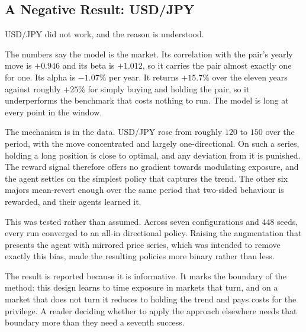 \subsection{A Negative Result: USD/JPY}
\label{Subsection:NegativeResult}

USD/JPY did not work, and the reason is understood.

The numbers say the model is the market. Its correlation with the pair's yearly move is $+0.946$ and its beta is $+1.012$, so it carries the pair almost exactly one for one. Its alpha is $-1.07\%$ per year. It returns $+15.7\%$ over the eleven years against roughly $+25\%$ for simply buying and holding the pair, so it underperforms the benchmark that costs nothing to run. The model is long at every point in the window.

The mechanism is in the data. USD/JPY rose from roughly $120$ to $150$ over the period, with the move concentrated and largely one-directional. On such a series, holding a long position is close to optimal, and any deviation from it is punished. The reward signal therefore offers no gradient towards modulating exposure, and the agent settles on the simplest policy that captures the trend. The other six majors mean-revert enough over the same period that two-sided behaviour is rewarded, and their agents learned it.

This was tested rather than assumed. Across seven configurations and $448$ seeds, every run converged to an all-in directional policy. Raising the augmentation that presents the agent with mirrored price series, which was intended to remove exactly this bias, made the resulting policies more binary rather than less.

The result is reported because it is informative. It marks the boundary of the method: this design learns to time exposure in markets that turn, and on a market that does not turn it reduces to holding the trend and pays costs for the privilege. A reader deciding whether to apply the approach elsewhere needs that boundary more than they need a seventh success.